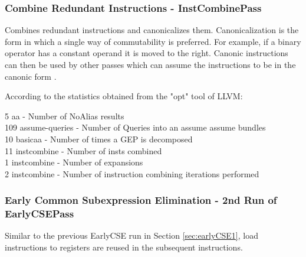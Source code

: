 \subsubsection{Combine Redundant Instructions - InstCombinePass}
Combines redundant instructions and canonicalizes them. Canonicalization is the form in which a single way of commutability is preferred. For example, if a binary operator has a constant operand it is moved to the right. Canonic instructions can then be used by other passes which can assume the instructions to be in the canonic form \cite{llvmpass-instcombine}.
\par 



\begin{minipage}{\linewidth}

\end{minipage}

According to the statistics obtained from the "opt" tool of LLVM:
\begin{displayquote}
  5 aa             - Number of NoAlias results \\
109 assume-queries - Number of Queries into an assume assume bundles \\
 10 basicaa        - Number of times a GEP is decomposed \\
 11 instcombine    - Number of insts combined \\
  1 instcombine    - Number of expansions \\
  2 instcombine    - Number of instruction combining iterations performed \\
\end{displayquote}

\subsubsection{Early Common Subexpression Elimination - 2nd Run of EarlyCSEPass}
Similar to the previous EarlyCSE run in Section \ref{sec:earlyCSE1}, load instructions to registers are reused in the subsequent instructions.


